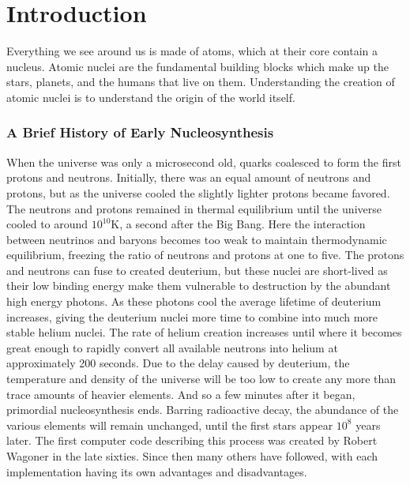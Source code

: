
\chapter{Introduction}
\label{chap:intro}

Everything we see around us is made of atoms, which at their core contain a nucleus. Atomic nuclei are the fundamental building blocks which make up the stars, planets, and the humans that live on them. Understanding the creation of atomic nuclei is to understand the origin of the world itself. 


\subsection*{A Brief History of Early Nucleosynthesis}
When the universe was only a microsecond old, quarks coalesced to form the first protons and neutrons\cite{NASAUniversehistory}. Initially, there was an equal amount of neutrons and protons, but as the universe cooled the slightly lighter protons became favored. The neutrons and protons remained in thermal equilibrium until the universe cooled to around $10^{10}$K, a second after the Big Bang. Here the interaction between neutrinos and baryons becomes too weak to maintain thermodynamic equilibrium, freezing the ratio of neutrons and protons at one to five. The protons and neutrons can fuse to created deuterium, but these nuclei are short-lived as their low binding energy make them vulnerable to destruction by the abundant high energy photons. As these photons cool the average lifetime of deuterium increases,
giving the deuterium nuclei more time to combine into much more stable helium nuclei. The rate of helium creation increases until where it becomes great enough to rapidly convert all available neutrons into helium at approximately 200 seconds. Due to the delay caused by deuterium, the temperature and density of the universe will be too low to create any more than trace amounts of heavier elements. And so a few minutes after it began, primordial nucleosynthesis ends. Barring radioactive decay, the abundance of the various elements will remain unchanged, until the first stars appear $10^8$ years later\cite{klessen2023firststars}. 
The first computer code describing this process was created by Robert Wagoner in the late sixties\cite{Wagoner67}. Since then many others have followed, with each implementation having its own advantages and disadvantages.
\clearpage
